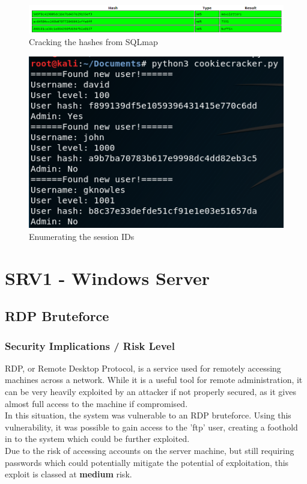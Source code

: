 \documentclass{report}
\begin{document}
\begin{figure}[!htb]
	\centering
	\includegraphics[scale=0.5]{img/crackstation.png}
	\caption{Cracking the hashes from SQLmap}
\end{figure}
\begin{figure}[!htb]
	\centering
	\includegraphics[scale=0.6]{img/cookie1.png}
	\caption{Enumerating the session IDs}
\end{figure}



\section{SRV1 - Windows Server}
\subsection{RDP Bruteforce}
\subsubsection{Security Implications / Risk Level}
RDP, or Remote Desktop Protocol, is a service used for remotely accessing machines across a network. While it is a useful tool for remote administration, it can be very heavily exploited by an attacker if not properly secured, as it gives almost full access to the machine if compromised. \\
In this situation, the system was vulnerable to an RDP bruteforce. Using this vulnerability, it was possible to gain access to the 'ftp' user, creating a foothold in to the system which could be further exploited.\\
Due to the risk of accessing accounts on the server machine, but still requiring passwords which could potentially mitigate the potential of exploitation, this exploit is classed at \textbf{medium} risk.
\end{document}
